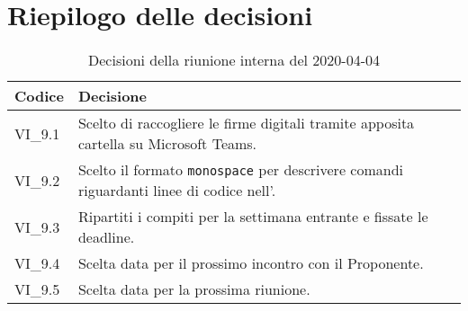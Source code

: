 \section{Riepilogo delle decisioni}
\begin{longtable}{ 
	 >{\centering}p{} >{}p{} }
	
	\caption{Decisioni della riunione interna del 2020-04-04}\\	
	
	\textbf{\color{white}Codice} & 
	\textbf{\color{white}Decisione} 
	\tabularnewline  
	\endhead
	
	VI\_9.1 & Scelto di raccogliere le firme digitali tramite apposita cartella su Microsoft Teams. \\
	VI\_9.2 & Scelto il formato \texttt{monospace} per descrivere comandi riguardanti linee di codice nell'\AdR. \\
	VI\_9.3 & Ripartiti i compiti per la settimana entrante e fissate le deadline. \\
	VI\_9.4 & Scelta data per il prossimo incontro con il Proponente. \\
	VI\_9.5 & Scelta data per la prossima riunione. \\
	
\end{longtable}